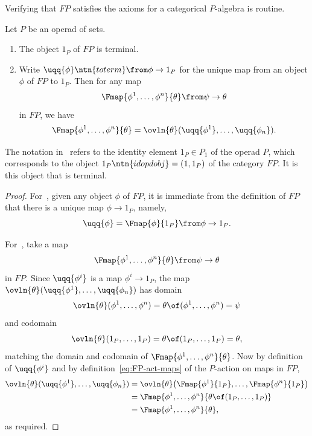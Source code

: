 Verifying that $FP$
satisfies the axioms for a categorical $P$-algebra is routine.


\begin{lemma}
Let $P$ be an operad of sets.  
% 
\begin{enumerate}
\item 
{}
The object $1_P$ of $FP$ is terminal.

\item
{}
% 
Write $\uqq{\phi}\ntn{toterm} \from \phi \to 1_P$ for the unique map from
an object $\phi$ of $FP$ to $1_P$.  Then for any map
\[
\Fmap{\phi^1, \ldots, \phi^n}{\theta} \from \psi \to \theta
\]
in $FP$, we have
\[
\Fmap{\phi^1, \ldots, \phi^n}{\theta}
=
\ovln{\theta}(\uqq{\phi^1}, \ldots, \uqq{\phi_n}).
\]
\end{enumerate}
\end{lemma}

The notation in~ refers to the identity element
$1_P \in P_1$ of the operad $P$, which corresponds to the object
$1_P\ntn{idopdobj} = (1, 1_P)$ of the category $FP$.  It is this object
that is terminal.

\begin{proof}
For~, given any object $\phi$ of $FP$, it is
immediate from the definition of $FP$ that there is a unique map $\phi \to
1_P$, namely, 
\[
\uqq{\phi} = \Fmap{\phi}{1_P} \from \phi \to 1_P.
\]

For~, take a map
\[
\Fmap{\phi^1, \ldots, \phi^n}{\theta} \from \psi \to \theta
\]
in $FP$.  Since $\uqq{\phi^i}$ is a map $\phi^i \to 1_P$, the map
$
\ovln{\theta}(\uqq{\phi^1}, \ldots, \uqq{\phi_n})
$
has domain 
\[
\ovln{\theta}(\phi^1, \ldots, \phi^n)
=
\theta \of (\phi^1, \ldots, \phi^n)
=
\psi
\]
and codomain
\[
\ovln{\theta}(1_P, \ldots, 1_P)
=
\theta \of (1_P, \ldots, 1_P)
=
\theta,
\]
matching the domain and codomain of $\Fmap{\phi^1, \ldots,
  \phi^n}{\theta}$.  Now by definition of $\uqq{\phi^i}$ and by
definition~\eqref{eq:FP-act-maps} of the $P$-action on maps in $FP$,
% 
\begin{align*}
\ovln{\theta}(\uqq{\phi^1}, \ldots, \uqq{\phi_n})   &
=
\ovln{\theta}\bigl(\Fmap{\phi^1}{1_P}, \ldots, \Fmap{\phi^n}{1_P}\bigr) \\
&
=
\Fmap{\phi^1, \ldots, \phi^n}{\theta\of(1_P, \ldots, 1_P)}      \\
&
=
\Fmap{\phi^1, \ldots, \phi^n}{\theta},
\end{align*}
% 
as required.
\end{proof}

